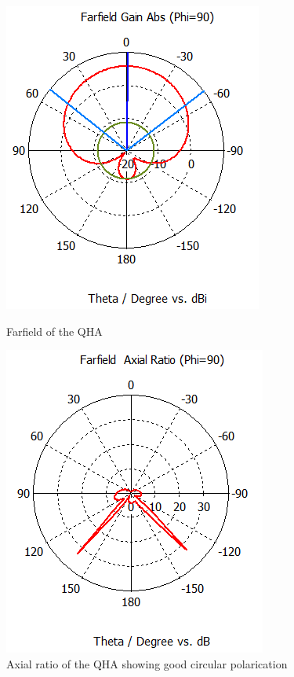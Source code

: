 \begin{figure}[H]
  \centering
  \begin{minipage}[b]{0.5\textwidth}
	\includegraphics[scale = 0.6]{figures/antennas/qha/1090mhz_ff}
	\caption{Farfield of the QHA}
    \label{fig:1090_ff}
  \end{minipage}
  \hfill
  \begin{minipage}[b]{0.4\textwidth}
\includegraphics[scale = 0.6]{figures/antennas/qha/1090mhz_ar}
\caption{Axial ratio of the QHA showing good circular polarication}
    \label{fig:1090_ar}
  \end{minipage}
\end{figure}

